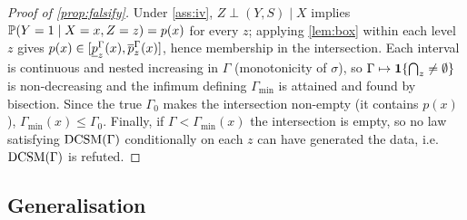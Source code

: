 \begin{proof}[Proof of \cref{prop:falsify}]
Under \cref{ass:iv}, $Z\perp(Y,S)\mid X$ implies $\mathbb{P}(Y=1\mid X=x,Z=z)=p(x)$
for every $z$; applying \cref{lem:box} within each level $z$ gives
$p(x)\in[\underline{p}_z^\Gamma(x),\overline{p}_z^\Gamma(x)]$, hence membership in the
intersection. Each interval is continuous and nested increasing in $\Gamma$
(monotonicity of $\sigma$), so $\Gamma\mapsto\mathbf{1}\{\bigcap_z\neq\emptyset\}$ is
non-decreasing and the infimum defining $\Gamma_{\min}$ is attained and found by
bisection. Since the true $\Gamma_0$ makes the intersection non-empty (it
contains $p(x)$), $\Gamma_{\min}(x)\le\Gamma_0$. Finally, if
$\Gamma<\Gamma_{\min}(x)$ the intersection is empty, so no law satisfying
$\textup{DCSM}(\Gamma)$ conditionally on each $z$ can have generated the data, i.e.\
$\textup{DCSM}(\Gamma)$ is refuted.
\end{proof}

\subsection{Generalisation}
\label{app:generalization}

